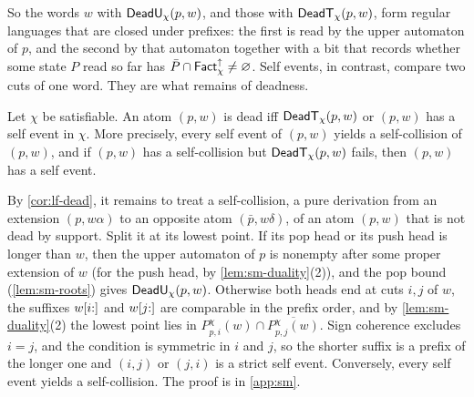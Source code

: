 So the words $w$ with $\mathsf{DeadU}_\chi(p,w)$, and those with $\mathsf{DeadT}_\chi(p,w)$,
form regular languages that are closed under prefixes: the first is read by
the upper automaton of $p$, and the second by that automaton together with a
bit that records whether some state $P$ read so far has
$\bar P\cap\mathsf{Fact}^{\uparrow}_{\chi}\ne\varnothing$. Self events, in contrast, compare two cuts
of one word. They are what remains of deadness.

\begin{theorem}[Deadness]\label{thm:sm-dead}
Let $\chi$ be satisfiable. An atom $(p,w)$ is dead iff $\mathsf{DeadT}_\chi(p,w)$ or
$(p,w)$ has a self event in $\chi$. More precisely, every self event of $(p,w)$
yields a self-collision of $(p,w)$, and if $(p,w)$ has a self-collision but
$\mathsf{DeadT}_\chi(p,w)$ fails, then $(p,w)$ has a self event.
\end{theorem}

By \cref{cor:lf-dead}, it remains to treat a self-collision, a pure
derivation from an extension $(p,w\alpha)$ to an opposite atom
$(\bar p,w\delta)$, of an atom $(p,w)$ that is not dead by support. Split it
at its lowest point. If its pop head or its push head is longer than $w$, then the upper automaton of $p$ is
nonempty after some proper extension of $w$ (for the push head, by
\cref{lem:sm-duality}(2)), and the pop bound (\cref{lem:sm-roots}) gives
$\mathsf{DeadU}_\chi(p,w)$. Otherwise both heads end at cuts $i,j$ of $w$, the
suffixes $w[i{:}]$ and $w[j{:}]$ are comparable in the prefix order, and by
\cref{lem:sm-duality}(2) the lowest point lies in
$P^\chi_{p,i}(w)\cap\overline{P^\chi_{p,j}(w)}$. Sign coherence excludes
$i=j$, and the condition is symmetric in $i$ and $j$, so the shorter suffix is
a prefix of the longer one and $(i,j)$ or $(j,i)$ is a strict self event.
Conversely, every self event yields a self-collision. The proof is in
\cref{app:sm}.


